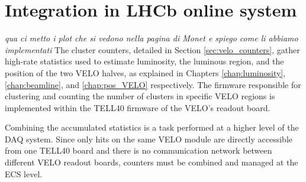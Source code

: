 \label{chp:results}
\chapter{Integration in LHCb online system}
\textit{qua ci metto i plot che si vedono nella pagina di Monet e spiego come li abbiamo implementati}
The cluster counters, detailed in Section \ref{sec:velo_counters}, gather high-rate statistics used to estimate luminosity, the luminous region, and the position of the two VELO halves, as explained in Chapters \ref{chap:luminosity}, \ref{chap:beamline}, and \ref{chap:pos_VELO} respectively. The firmware responsible for clustering and counting the number of clusters in specific VELO regions is implemented within the TELL40 firmware of the VELO's readout board.

Combining the accumulated statistics is a task performed at a higher level of the DAQ system. Since only hits on the same VELO module are directly accessible from one TELL40 board and there is no communication network between different VELO readout boards, counters must be combined and managed at the ECS level. 
\section{}